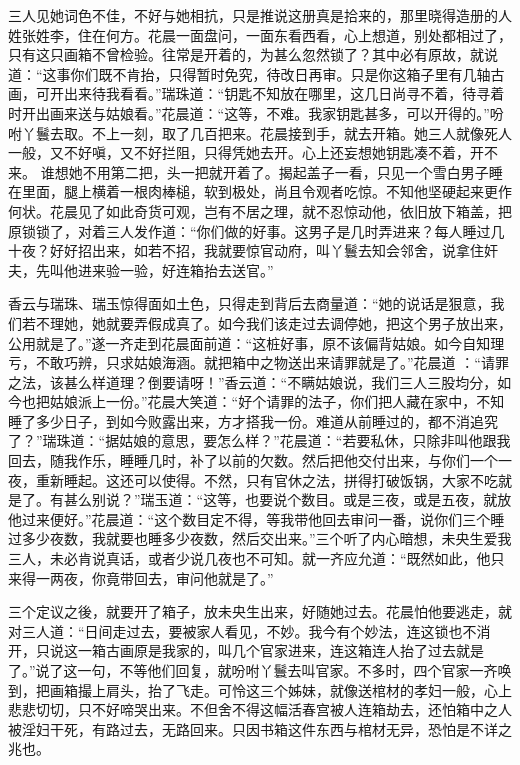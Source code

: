 \documentclass[a4paper,12pt,UTF8,twoside]{ctexbook}
\begin{document}
三人见她词色不佳，不好与她相抗，只是推说这册真是拾来的，那里晓得造册的人姓张姓李，住在何方。花晨一面盘问，一面东看西看，心上想道，别处都相过了，只有这只画箱不曾检验。往常是开着的，为甚么忽然锁了？其中必有原故，就说道：“这事你们既不肯抬，只得暂时免究，待改日再审。只是你这箱子里有几轴古画，可开出来待我看看。”瑞珠道：“钥匙不知放在哪里，这几日尚寻不着，待寻着时开出画来送与姑娘看。”花晨道：“这等，不难。我家钥匙甚多，可以开得的。”吩咐丫鬟去取。不上一刻，取了几百把来。花晨接到手，就去开箱。她三人就像死人一般，又不好嗔，又不好拦阻，只得凭她去开。心上还妄想她钥匙凑不着，开不来。 谁想她不用第二把，头一把就开着了。揭起盖子一看，只见一个雪白男子睡在里面，腿上横着一根肉棒槌，软到极处，尚且令观者吃惊。不知他坚硬起来更作何状。花晨见了如此奇货可观，岂有不居之理，就不忍惊动他，依旧放下箱盖，把原锁锁了，对着三人发作道：“你们做的好事。这男子是几时弄进来？每人睡过几十夜？好好招出来，如若不招，我就要惊官动府，叫丫鬟去知会邻舍，说拿住奸夫，先叫他进来验一验，好连箱抬去送官。”

香云与瑞珠、瑞玉惊得面如土色，只得走到背后去商量道：“她的说话是狠意，我们若不理她，她就要弄假成真了。如今我们该走过去调停她，把这个男子放出来，公用就是了。”遂一齐走到花晨面前道：“这桩好事，原不该偏背姑娘。如今自知理亏，不敢巧辨，只求姑娘海涵。就把箱中之物送出来请罪就是了。”花晨道 ：“请罪之法，该甚么样道理？倒要请呀！”香云道：“不瞒姑娘说，我们三人三股均分，如今也把姑娘派上一份。”花晨大笑道：“好个请罪的法子，你们把人藏在家中，不知睡了多少日子，到如今败露出来，方才搭我一份。难道从前睡过的，都不消追究了？”瑞珠道：“据姑娘的意思，要怎么样？”花晨道：“若要私休，只除非叫他跟我回去，随我作乐，睡睡几时，补了以前的欠数。然后把他交付出来，与你们一个一夜，重新睡起。这还可以使得。不然，只有官休之法，拼得打破饭锅，大家不吃就是了。有甚么别说？”瑞玉道：“这等，也要说个数目。或是三夜，或是五夜，就放他过来便好。”花晨道：“这个数目定不得，等我带他回去审问一番，说你们三个睡过多少夜数，我就要也睡多少夜数，然后交出来。”三个听了内心暗想，未央生爱我三人，未必肯说真话，或者少说几夜也不可知。就一齐应允道：“既然如此，他只来得一两夜，你竟带回去，审问他就是了。”

三个定议之後，就要开了箱子，放未央生出来，好随她过去。花晨怕他要逃走，就对三人道：“日间走过去，要被家人看见，不妙。我今有个妙法，连这锁也不消开，只说这一箱古画原是我家的，叫几个官家进来，连这箱连人抬了过去就是了。”说了这一句，不等他们回复，就吩咐丫鬟去叫官家。不多时，四个官家一齐唤到，把画箱撮上肩头，抬了飞走。可怜这三个姊妹，就像送棺材的孝妇一般，心上悲悲切切，只不好啼哭出来。不但舍不得这幅活春宫被人连箱劫去，还怕箱中之人被淫妇干死，有路过去，无路回来。只因书箱这件东西与棺材无异，恐怕是不详之兆也。
\end{document}
